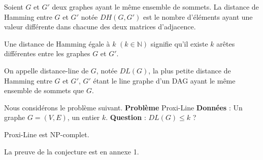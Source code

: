 \begin{definition}
Soient $G$ et $G'$ deux graphes ayant le m\^eme ensemble  de sommets.
La distance de Hamming entre $G$ et $G'$ not\'ee $DH(G,G')$ est le nombre d'\'el\'ements ayant une valeur diff\'erente dans chacune des deux matrices d'adjacence.
\end{definition}
Une distance de Hamming \'egale \`a $k$ $(k \in \mathbb{N})$ signifie qu'il existe $k$ ar\^etes diff\'erentes entre  les graphes $G$ et $G'$.

\begin{definition}
On appelle distance-line de $G$, not\'ee $DL(G)$, la plus petite distance de Hamming entre $G$ et $G'$, $G'$ \'etant le line graphe d'un DAG ayant le m\^eme ensemble de sommets que $G$.
\end{definition}

Nous consid\'erons le probl\`eme suivant. \newline
{\bf Probl\`eme} Proxi-Line \newline
{\bf Donn\'ees} : Un graphe $G=(V,E)$, un entier $k$. \newline
{\bf Question} : $DL(G) \le k$ ? \newline

\begin{conjecture}
Proxi-Line est NP-complet.
\end{conjecture}

La preuve de la conjecture est en annexe 1.